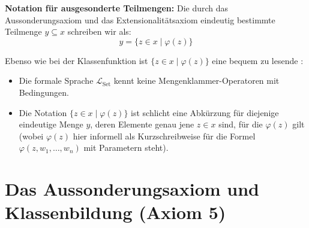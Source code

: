 \begin{math-stroke}
\begin{axioms}
\end{axioms}

\textbf{Notation für ausgesonderte Teilmengen:}
Die durch das Aussonderungsaxiom und das Extensionalitätsaxiom eindeutig bestimmte Teilmenge $y \subseteq x$ schreiben wir als:
\[
y = \{ z \in x \mid \varphi(z) \}
\]

\begin{explanation-of-steps}
Ebenso wie bei der Klassenfunktion ist $\{ z \in x \mid \varphi(z) \}$ eine bequem zu lesende :
\begin{itemize}
    \item Die formale Sprache $\mathcal{L}_{\text{Set}}$ kennt keine Mengenklammer-Operatoren mit Bedingungen.
    \item Die Notation $\{ z \in x \mid \varphi(z) \}$ ist schlicht eine Abkürzung für diejenige eindeutige Menge $y$, deren Elemente genau jene $z \in x$ sind, für die $\varphi(z)$ gilt (wobei $\varphi(z)$ hier informell als Kurzschreibweise für die Formel $\varphi(z, w_1, \dots, w_n)$ mit Parametern steht).
\end{itemize}
\end{explanation-of-steps}
\end{math-stroke}

\section{Das Aussonderungsaxiom und Klassenbildung (Axiom 5)}


